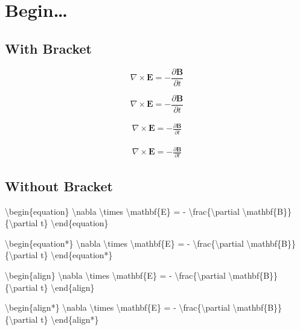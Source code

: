 \chapter{Begin{\ldots}}
\label{begin...}

\section{With Bracket}
\label{withbracket}

\begin{equation}
\nabla \times \mathbf{E} = - \frac{\partial \mathbf{B}}{\partial t}
\end{equation}

\begin{equation*}
\nabla \times \mathbf{E} = - \frac{\partial \mathbf{B}}{\partial t}
\end{equation*}

\begin{align}
\nabla \times \mathbf{E} = - \frac{\partial \mathbf{B}}{\partial t}
\end{align}

\begin{align*}
\nabla \times \mathbf{E} = - \frac{\partial \mathbf{B}}{\partial t}
\end{align*}

\section{Without Bracket}
\label{withoutbracket}

\textbackslash{}begin\{equation\}
\textbackslash{}nabla \textbackslash{}times \textbackslash{}mathbf\{E\} = - \textbackslash{}frac\{\textbackslash{}partial \textbackslash{}mathbf\{B\}\}\{\textbackslash{}partial t\}
\textbackslash{}end\{equation\}

\textbackslash{}begin\{equation*\}
\textbackslash{}nabla \textbackslash{}times \textbackslash{}mathbf\{E\} = - \textbackslash{}frac\{\textbackslash{}partial \textbackslash{}mathbf\{B\}\}\{\textbackslash{}partial t\}
\textbackslash{}end\{equation*\}

\textbackslash{}begin\{align\}
\textbackslash{}nabla \textbackslash{}times \textbackslash{}mathbf\{E\} = - \textbackslash{}frac\{\textbackslash{}partial \textbackslash{}mathbf\{B\}\}\{\textbackslash{}partial t\}
\textbackslash{}end\{align\}

\textbackslash{}begin\{align*\}
\textbackslash{}nabla \textbackslash{}times \textbackslash{}mathbf\{E\} = - \textbackslash{}frac\{\textbackslash{}partial \textbackslash{}mathbf\{B\}\}\{\textbackslash{}partial t\}
\textbackslash{}end\{align*\}

